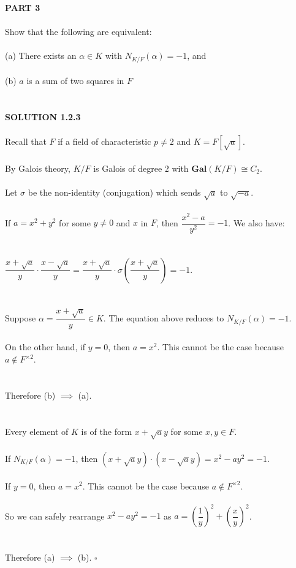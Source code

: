 \documentclass{article}
\begin{document}
\noindent \textbf{PART 3} \\\\
\indent Show that the following are equivalent: \\\\
\indent \indent (a) \indent There exists an $\alpha \in K$ with $N_{K/F}(\alpha) = -1$, and \\\\
\indent \indent (b) \indent $a$ is a sum of two squares in $F$ \\\\
\\
\textbf{SOLUTION 1.2.3} \\\\
\noindent Recall that $F$ if a field of characteristic $p \neq 2$ and $K = F[\sqrt{a}]$. \\\\
By Galois theory, $K/F$ is Galois of degree $2$ with $\textbf{Gal}(K/F) \cong C_2$. \\\\
Let $\sigma$ be the non-identity (conjugation) which sends $\sqrt{a}$ to $\sqrt{-a}$. \\\\
If $a = x^2 + y^2$ for some $y \neq 0$ and $x$ in $F$, then $\dfrac{x^2-a}{y^2} = -1$. We also have: \\\\\\
\indent \indent $\dfrac{x + \sqrt{a}}{y} \cdot \dfrac{x - \sqrt{a}}{y} =\dfrac{x + \sqrt{a}}{y} \cdot \sigma(\dfrac{x + \sqrt{a}}{y}) = -1$. \\\\\\
Suppose $\alpha = \dfrac{x + \sqrt{a}}{y} \in K$. The equation above reduces to $N_{K/F}(\alpha) = -1$. \\\\
On the other hand, if $y = 0$, then $a = x^2$. This cannot be the case because $a \notin F^{\times2}$. \\\\\\
Therefore (b) $\implies$ (a). \\\\\\
Every element of $K$ is of the form $x + \sqrt{a} y$ for some $x, y \in F$. \\\\
If $N_{K/F}(\alpha) = -1$, then $(x + \sqrt{a}y) \cdot (x - \sqrt{a}y) = x^2 - ay^2 = -1$. \\\\
If $y = 0$, then $a = x^2$. This cannot be the case because $a \notin F^{\times2}$. \\\\
So we can safely rearrange $x^2 - ay^2 = -1$ as $a = \left(\dfrac{1}{y}\right)^2 + \left(\dfrac{x}{y}\right)^2$. \\\\\\
Therefore (a) $\implies$ (b). $\square$ \\\\
\pagebreak
\end{document}
